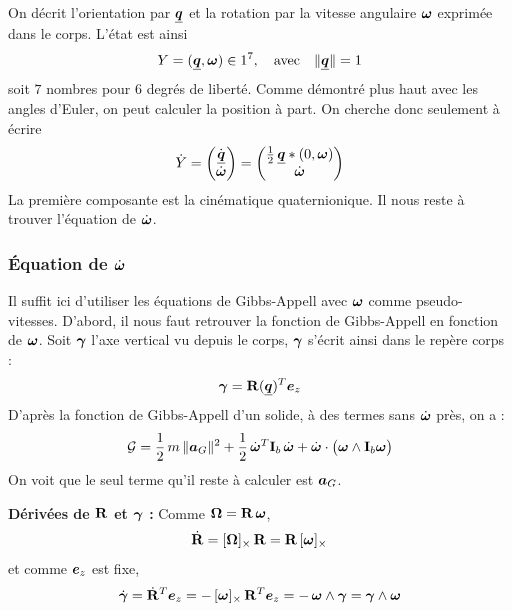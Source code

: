 On décrit l'orientation par $\underline{\bm{q}}$ et la rotation par la vitesse
angulaire $\bm{\omega}$ exprimée dans le corps. L'état est ainsi 
\[
    Y = (\underline{\bm{q}},\bm{\omega})\in1^7, \quad \text{avec} \quad \|\underline{\bm{q}}\| = 1
\]
soit $7$ nombres pour $6$ degrés de liberté. Comme démontré plus haut avec les angles d'Euler, on peut calculer la position à part. On cherche donc seulement à écrire
\[
    \dot Y = \begin{pmatrix}
        \dot{\underline{\bm{q}}}\\ \dot{\bm{\omega}}
    \end{pmatrix}
    = \begin{pmatrix}
        \tfrac12\,\underline{\bm{q}}\ast(0,\bm{\omega})\\
        \dot{\bm{\omega}}
    \end{pmatrix}
\]
La première composante est la cinématique quaternionique. Il nous reste à trouver l'équation de $\dot{\bm{\omega}}$.

\subsubsection{Équation de \texorpdfstring{$\dot{\bm{\omega}}$}{omega point}}
Il suffit ici d'utiliser les équations de Gibbs-Appell avec $\bm{\omega}$ comme
pseudo-vitesses.
D'abord, il nous faut retrouver la fonction de Gibbs-Appell en fonction de $\bm{\omega}$.
Soit $\bm{\gamma}$ l'axe vertical vu depuis le corps, $\bm{\gamma}$ s'écrit ainsi dans le repère corps :
\[
    \bm{\gamma} = \mathbf{R}(\underline{\bm{q}})^T\bm{e}_z
\]
D'après la fonction de Gibbs-Appell d'un solide, à des termes sans $\dot{\bm{\omega}}$ près, on a :
\[
    \mathcal{G} = \frac{1}{2}\,m\,\|\bm{a}_G\|^2
    + \frac{1}{2}\,\dot{\bm{\omega}}^T\mathbf{I}_b\,\dot{\bm{\omega}}
    + \dot{\bm{\omega}}\cdot\bigl(\bm{\omega}\wedge
    \mathbf{I}_b\bm{\omega}\bigr)
\]
On voit que le seul terme qu'il reste à calculer est $\bm{a}_G$.

\textbf{Dérivées de $\mathbf{R}$ et $\bm{\gamma}$ : } Comme
$\bm{\Omega} = \mathbf{R}\,\bm{\omega}$,
\[
    \dot{\mathbf{R}} = [\bm{\Omega}]_{\times}\,\mathbf{R}
    = \mathbf{R}\,[\bm{\omega}]_{\times}
\]
et comme $\bm{e}_z$ est fixe,
\[
    \dot{\bm{\gamma}} = \dot{\mathbf{R}}^T\bm{e}_z
    = -\,[\bm{\omega}]_{\times}\,\mathbf{R}^T\bm{e}_z
    = -\,\bm{\omega}\wedge\bm{\gamma}
    = \bm{\gamma}\wedge\bm{\omega}
\]


